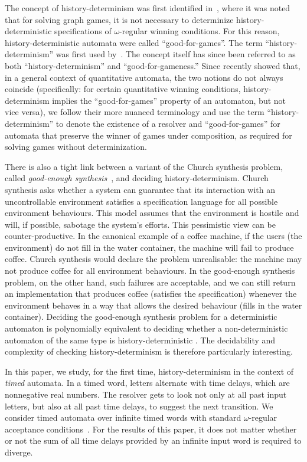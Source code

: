 \documentclass[10pt,a4paper]{amsart}
\theoremstyle{definition}
\numberwithin{equation}{section}
\begin{document}
The concept of history-determinism was first identified in~\cite{HP06},
where it was noted that for solving graph games, it is not necessary to
determinize history-deterministic specifications of $\omega$-regular
winning conditions.
For this reason, history-deterministic automata were called
``good-for-games''. %
The term ``history-determinism'' was first used by~\cite{Col09}.
The concept itself has since been referred to %
as both
``history-determinism'' and ``good-for-gameness.''
Since \cite{BL21} recently showed that, in a general context of quantitative
automata, the two notions do not always coincide
(specifically: for certain quantitative winning conditions, history-determinism
implies the ``good-for-games'' property of an automaton, but not vice versa),
we follow their more nuanced terminology and use the term ``history-determinism''
to denote the existence of a resolver and ``good-for-games'' for automata that preserve the winner of games under composition, as required for solving games without determinization.

There is also a tight link between a variant of the Church synthesis
problem, called \textit{good-enough synthesis}~\cite{AK20}, and deciding
history-determinism.
Church synthesis asks whether a system can guarantee that its interaction with
an uncontrollable environment satisfies a specification language for all possible
environment behaviours.
This model assumes that the environment is hostile and will, if possible,
sabotage the system's efforts.
This pessimistic view can be counter-productive.
In the canonical example of a coffee machine,
if the users (the environment) do not fill in the water container, the machine
will fail to produce coffee.
Church synthesis would declare the problem unrealisable: the machine
may not produce coffee for all environment behaviours.
In the good-enough synthesis problem, on the other hand, such failures are
acceptable, and we can still return an implementation that produces coffee
(satisfies the specification) whenever the environment behaves in a way that
allows the desired behaviour (fills in the water container).
Deciding the good-enough synthesis problem for a deterministic automaton is
polynomially equivalent to deciding whether a non-deterministic automaton of
the same type is history-deterministic \cite{FLW20,BL21,GJLZ21}.
The decidability and complexity
of checking history-determinism is therefore particularly interesting.

In this paper, we study, for the first time, history-determinism in the context
of \emph{timed} automata.
In a timed word, letters alternate with time delays, which are nonnegative real
numbers.
The resolver gets to look not only at all past input letters,
but also at all past time delays, to suggest the next transition.
We consider timed automata over infinite timed words with standard
$\omega$-regular acceptance conditions~\cite{AD1994}.
For the results of this paper, it does not matter whether or not the sum of all
time delays provided by an infinite input word is required to diverge.
\end{document}
